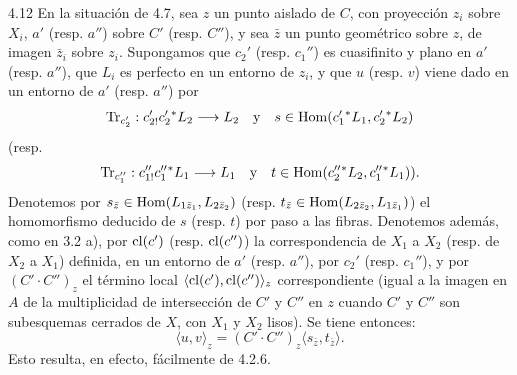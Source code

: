 \begin{statement}{4.12}
En la situación de 4.7, sea $z$ un punto aislado de $C$, con proyección $z_i$ sobre $X_i$, $a'$ (resp. $a''$) sobre $C'$ (resp. $C''$), y sea $\bar z$ un punto geométrico sobre $z$, de imagen $\bar z_i$ sobre $z_i$. Supongamos que $c_2'$ (resp. $c_1''$) es cuasifinito y plano en $a'$ (resp. $a''$), que $L_i$ es perfecto en un entorno de $z_i$, y que $u$ (resp. $v$) viene dado en un entorno de $a'$ (resp. $a''$) por
\[
\operatorname{Tr}_{c_2'}:c_{2!}'c_2'{}^*L_2\longrightarrow L_2
\quad\text{y}\quad
s\in\operatorname{Hom}(c_1'{}^*L_1,c_2'{}^*L_2)
\]
(resp.
\[
\operatorname{Tr}_{c_1''}:c_{1!}''c_1''{}^*L_1\longrightarrow L_1
\quad\text{y}\quad
t\in\operatorname{Hom}(c_2''{}^*L_2,c_1''{}^*L_1)).
\]
Denotemos por $s_{\bar z}\in\operatorname{Hom}(L_{1\bar z_1},L_{2\bar z_2})$ (resp. $t_{\bar z}\in\operatorname{Hom}(L_{2\bar z_2},L_{1\bar z_1})$) el homomorfismo deducido de $s$ (resp. $t$) por paso a las fibras. Denotemos además, como en 3.2 a), por $\operatorname{cl}(c')$ (resp. $\operatorname{cl}(c'')$) la correspondencia de $X_1$ a $X_2$ (resp. de $X_2$ a $X_1$) definida, en un entorno de $a'$ (resp. $a''$), por $c_2'$ (resp. $c_1''$), y por $(C'\!\cdot C'')_z$ el término local $\langle\operatorname{cl}(c'),\operatorname{cl}(c'')\rangle_z$ correspondiente (igual a la imagen en $A$ de la multiplicidad de intersección de $C'$ y $C''$ en $z$ cuando $C'$ y $C''$ son subesquemas cerrados de $X$, con $X_1$ y $X_2$ lisos). Se tiene entonces:
\begin{equation}
\tag{4.12.1}
\langle u,v\rangle_z=(C'\!\cdot C'')_z\langle s_{\bar z},t_{\bar z}\rangle.
\end{equation}
Esto resulta, en efecto, fácilmente de 4.2.6.
\end{statement}

